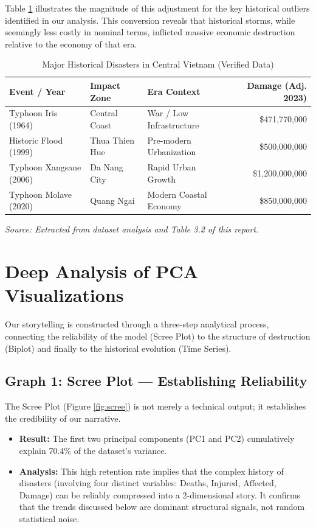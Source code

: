 \documentclass[12pt, a4paper]{report}
\begin{document}
Table \ref{tab:story_outliers} illustrates the magnitude of this adjustment for the key historical outliers identified in our analysis. This conversion reveals that historical storms, while seemingly less costly in nominal terms, inflicted massive economic destruction relative to the economy of that era.

\begin{table}[h]
    \centering
    \caption{Major Historical Disasters in Central Vietnam (Verified Data)}
    \label{tab:story_outliers}
    \begin{tabular}{lllr}
        \toprule
        \textbf{Event / Year} & \textbf{Impact Zone} & \textbf{Era Context} & \textbf{Damage (Adj. 2023)} \\
        \midrule
        Typhoon Iris (1964) & Central Coast & War / Low Infrastructure & \$471,770,000 \\
        Historic Flood (1999) & Thua Thien Hue & Pre-modern Urbanization & \$500,000,000 \\
        Typhoon Xangsane (2006) & Da Nang City & Rapid Urban Growth & \$1,200,000,000 \\
        Typhoon Molave (2020) & Quang Ngai & Modern Coastal Economy & \$850,000,000 \\
        \bottomrule
    \end{tabular}
    \vspace{0.2cm}
    \small{\textit{Source: Extracted from dataset analysis and Table 3.2 of this report.}}
\end{table}

\section{Deep Analysis of PCA Visualizations}
Our storytelling is constructed through a three-step analytical process, connecting the reliability of the model (Scree Plot) to the structure of destruction (Biplot) and finally to the historical evolution (Time Series).

\subsection{Graph 1: Scree Plot — Establishing Reliability}
The Scree Plot (Figure \ref{fig:scree}) is not merely a technical output; it establishes the credibility of our narrative.
\begin{itemize}
    \item \textbf{Result:} The first two principal components (PC1 and PC2) cumulatively explain 70.4\% of the dataset's variance.
    \item \textbf{Analysis:} This high retention rate implies that the complex history of disasters (involving four distinct variables: Deaths, Injured, Affected, Damage) can be reliably compressed into a 2-dimensional story. It confirms that the trends discussed below are dominant structural signals, not random statistical noise.
\end{itemize}
\end{document}
